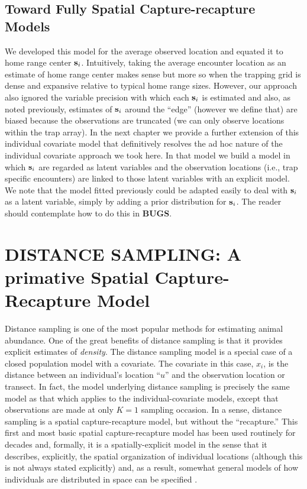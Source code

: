 \subsection{Toward Fully Spatial Capture-recapture Models}

We developed this model for the average observed location and equated
it to home range center ${\bf s}_{i}$. Intuitively, taking the average
encounter location as an estimate of home range center makes sense but
more so when the trapping grid is dense and expansive relative to
typical home range sizes.  However, our approach also ignored the
variable precision with which each ${\bf s}_{i}$ is estimated and also, as
noted previously, estimates of ${\bf s}_{i}$ around the ``edge'' (however we
define that) are biased because the observations are truncated (we can
only observe locations within the trap array).  In the next chapter we
provide a further extension of this individual covariate model that
definitively resolves the ad hoc nature of the individual covariate
approach we took here. In that model we build a model in which ${\bf s}_{i}$
are regarded as latent variables and the observation locations (i.e.,
trap specific encounters) are linked to those latent variables with an
explicit model. We note that the model fitted previously could be
adapted easily to deal with ${\bf s}_{i}$ as a latent variable, simply by
adding a prior distribution for ${\bf s}_{i}$. The reader should contemplate
how to do this in {\bf BUGS}.


\section{DISTANCE SAMPLING: A primative Spatial Capture-Recapture Model}

Distance sampling is one of the most popular methods for estimating
animal abundance. One of the great benefits of distance sampling is
that it provides explicit estimates of {\it density}. The distance
sampling model is a special case of a closed population model with a
covariate. The covariate in this case, $x_{i}$, is the distance
between an individual's location ``$u$'' and the observation location
or transect. In fact, the model underlying distance sampling is
precisely the same model as that which applies to the
individual-covariate models, except that observations are made at only
$K=1$ sampling occasion. In a sense, distance sampling is a spatial
capture-recapture model, but without the ``recapture.''  This first
and most basic spatial capture-recapture model has been used routinely
for decades and, formally, it is a spatially-explicit model in the
sense that it describes, explicitly, the spatial organization of
individual locations (although this is not always stated explicitly)
and, as a result, somewhat general models of how individuals are
distributed in space can be specified \citep{royle_etal:2004,
  johnson_etal:2010, sillett_etal:2011}.

